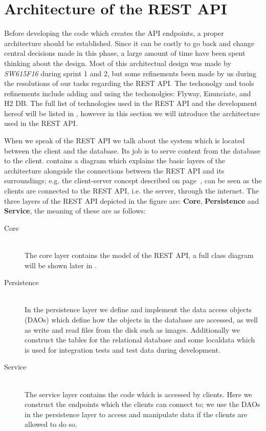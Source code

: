 \section{Architecture of the REST API}\label{sec:architecture}
Before developing the code which creates the API endpoints, a proper architecture should be established.
Since it can be costly to go back and change central decisions made in this phase, a large amount of time have been spent thinking about the design.
Most of this architectual design was made by \textit{SW615F16} during sprint 1 and 2, but some refinements been made by us during the resolutions of our tasks regarding the REST API.
The techonolgy and tools refinements include adding and using the techonolgies: Flyway, Enunciate, and H2 DB.
The full list of technologies used in the REST API and the development hereof will be listed in , however in this section we will introduce the architecture used in the REST API.

When we speak of the REST API we talk about the system which is located between the client and the database.
Its job is to serve content from the database to the client.
 contains a diagram which explains the basic layers of the architecture alongside the connections between the REST API and its surroundings; e.g. the client-server concept described on page~\pageref{client-server-rest}, can be seen as the clients are connected to the REST API, i.e. the server, through the internet.
The three layers of the REST API depicted in the figure are: \textbf{Core}, \textbf{Persistence} and \textbf{Service}, the meaning of these are as follows:
\begin{description}
    \item[Core] \hfill \\
    The core layer contains the model of the REST API, a full class diagram will be shown later in .

    \item[Persistence] \hfill \\
    In the persistence layer we define and implement the data access objects (DAOs) which define how the objects in the database are accessed, as well as write and read files from the disk such as images.
    Additionally we construct the tables for the relational database and some localdata which is used for integration tests and test data during development.

    \item[Service] \hfill \\
    The service layer contains the code which is accessed by clients.
    Here we construct the endpoints which the clients can connect to; we use the DAOs in the persistence layer to access and manipulate data if the clients are allowed to do so.
\end{description}

